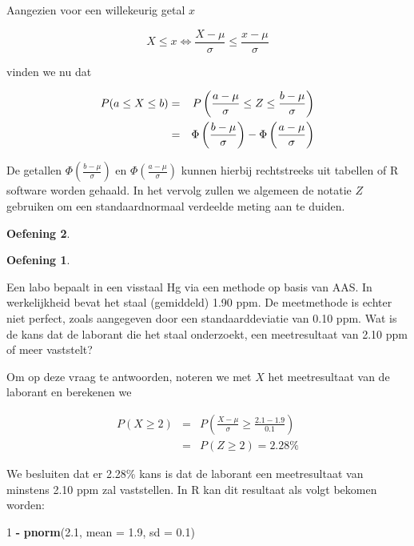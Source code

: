 \documentclass[
  12pt,dutch,coursenotes]{book}
\newenvironment{Shaded}{\begin{snugshade}}{\end{snugshade}}
\newcommand{\DataTypeTok}[1]{\textcolor[rgb]{0.13,0.29,0.53}{#1}}
\newcommand{\DecValTok}[1]{\textcolor[rgb]{0.00,0.00,0.81}{#1}}
\newcommand{\FloatTok}[1]{\textcolor[rgb]{0.00,0.00,0.81}{#1}}
\newcommand{\KeywordTok}[1]{\textcolor[rgb]{0.13,0.29,0.53}{\textbf{#1}}}
\newcommand{\NormalTok}[1]{#1}
\newcommand{\OperatorTok}[1]{\textcolor[rgb]{0.81,0.36,0.00}{\textbf{#1}}}
\newcommand{\StringTok}[1]{\textcolor[rgb]{0.31,0.60,0.02}{#1}}
\theoremstyle{definition}
\theoremstyle{definition}
\theoremstyle{definition}
\newtheorem{exercise}{Oefening}[chapter]
\theoremstyle{remark}
\begin{document}
Aangezien voor een willekeurig getal \(x\)

\begin{equation*}
X\leq x \Leftrightarrow \frac{X-\mu}{\sigma} \leq \frac{x-\mu}{\sigma}
\end{equation*}

vinden we nu dat

\begin{eqnarray*}
P(a \leq X \leq b) & = & P\left(\frac{a-\mu}{\sigma} \leq Z \leq \frac{b-\mu%
}{\sigma} \right) \\
& = & \Phi \left (\frac{b-\mu}{\sigma} \right ) - \Phi \left (\frac{a-\mu}{%
\sigma} \right )
\end{eqnarray*}

De getallen \(\Phi \left (\frac{b-\mu}{\sigma} \right )\) en \(\Phi \left (\frac{a-\mu}{\sigma} \right )\) kunnen hierbij rechtstreeks uit tabellen of R software worden gehaald. In het vervolg zullen we
algemeen de notatie \(Z\) gebruiken om een standaardnormaal verdeelde meting
aan te duiden.

\begin{exercise}
\begin{exercise}

\protect\hypertarget{exr:unnamed-chunk-42}{}{\label{exr:unnamed-chunk-42} }

\end{exercise}
\end{exercise}

Een labo bepaalt in een visstaal Hg via een methode op basis van AAS. In
werkelijkheid bevat het staal (gemiddeld) 1.90 ppm. De meetmethode is echter
niet perfect, zoals aangegeven door een standaarddeviatie van 0.10 ppm. Wat
is de kans dat de laborant die het staal onderzoekt, een meetresultaat van
2.10 ppm of meer vaststelt?

Om op deze vraag te antwoorden, noteren we met \(X\) het meetresultaat van de
laborant en berekenen we

\begin{eqnarray*}
P(X\geq 2)&=&P\left(\frac{X-\mu}{\sigma}\geq \frac{2.1-1.9}{0.1}\right) \\
&=&P(Z\geq 2) = 2.28\%
\end{eqnarray*}

We besluiten dat er 2.28\% kans is dat de laborant een meetresultaat van
minstens 2.10 ppm zal vaststellen. In R kan dit resultaat als volgt bekomen worden:

\begin{Shaded}
\begin{Highlighting}[]
\DecValTok{1} \OperatorTok{{-}}\StringTok{ }\KeywordTok{pnorm}\NormalTok{(}\FloatTok{2.1}\NormalTok{, }\DataTypeTok{mean =} \FloatTok{1.9}\NormalTok{, }\DataTypeTok{sd =} \FloatTok{0.1}\NormalTok{)}
\end{Highlighting}
\end{Shaded}
\end{document}
